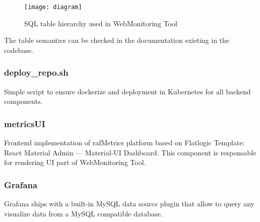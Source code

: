 \begin{figure}[H]
\centering
\texttt{[image: diagram]}
\caption{SQL table hierarchy used in WebMonitoring Tool}
\end{figure}

The table semantics can be checked in the documentation existing in the codebase.


\subsubsection{deploy\_repo.sh}
Simple script to ensure dockerize and deployment in Kubernetes for all backend components.

\subsubsection{metricsUI}
Frontend implementation of rafMetrics platform based on Flatlogic Template: React Material Admin — Material-UI Dashboard. This component is responsable for rendering UI part of WebMonitoring Tool.

\subsubsection{Grafana}
Grafana ships with a built-in MySQL data source plugin that allow to query any visualize data from a MySQL compatible database.
